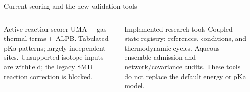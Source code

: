 \begin{frame}{Current scoring and the new validation tools}
\begin{columns}[T]
\begin{block}{Active reaction scorer}
\small UMA + gas thermal terms + ALPB.\gap
Tabulated pKa patterns; largely independent sites.\gap
Unsupported isotope inputs are withheld; the legacy SMD reaction correction is blocked.
\end{block}
\begin{block}{Implemented research tools}
\small Coupled-state registry: references, conditions, and thermodynamic cycles.\gap
Aqueous-ensemble admission and network/covariance audits.\gap
These tools do not replace the default energy or pKa model.
\end{block}
\end{columns}
\end{frame}
